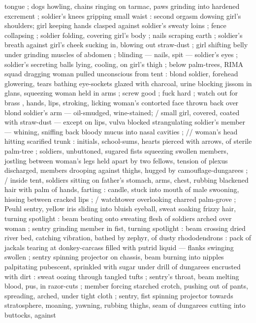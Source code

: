 \documentclass[10pt,twoside]{memoir}
\begin{document}
tongue ; dogs howling, chains ringing on tarmac, paws grinding into 
hardened excrement ; soldier's knees gripping small waist : second 
orgasm dowsing girl's shoulders; girl keeping hands clasped against 
soldier's sweaty loins ; fence collapsing ; soldier folding, covering 
girl's body ; nails scraping earth ; soldier's breath against girl's 
cheek sucking in, blowing out straw-dust ; girl shifting belly under 
grinding muscles of abdomen ; blinding --- nails, spit --- soldier's 
eyes ; soldier's secreting balls lying, cooling, on girl's thigh ; below 
palm-trees, RIMA squad dragging woman pulled unconscious from 
tent : blond soldier, forehead glowering, tears bathing eye-sockets 
glazed with charcoal, urine blocking jissom in glans, squeezing 
woman held in arms ; {\guillemotleft} screw good ; fuck hard ; watch out for brass
{\guillemotright}, hands, lips, stroking, licking woman's contorted face thrown back 
over blond soldier's arm --- oil-smudged, wine-stained; / small girl, 
covered, coated with straw-dust --- except on lips, vulva blocked 
strangulating soldier's member --- whining, sniffing back bloody 
mucus into nasal cavities ; // woman's head hitting scarified trunk : 
initials, school-sums, hearts pierced with arrows, of sterile palm-tree 
; soldiers, unbuttoned, sugared fists squeezing swollen members, 
jostling between woman's legs held apart by two fellows, tension of 
plexus discharged, members drooping against thighs, hugged by 
camouflage-dungarees ; / inside tent, soldiers sitting on father's 
stomach, arms, chest, rubbing blackened hair with palm of hands, 
farting : candle, stuck into mouth of male swooning, hissing between 
cracked lips ; / watchtower overlooking charred palm-grove ; Peuhl 
sentry, yellow iris sliding into bluish eyeball, sweat soaking frizzy 
hair, turning spotlight : beam beating onto sweating flesh of soldiers 
arched over woman ; sentry grinding member in fist, turning spotlight 
: beam crossing dried river bed, catching vibration, bathed by zephyr, 
of dusty rhododendrons : pack of jackals tearing at donkey-carcass 
filled with putrid liquid --- flanks swinging swollen ; sentry spinning 
projector on chassis, beam burning into nipples palpitating 
pubescent, sprinkled with sugar under drill of dungarees encrusted 
with dirt : sweat oozing through tangled tufts ; sentry's throat, beam 
melting blood, pus, in razor-cuts ; member forcing starched crotch, 
pushing out of pants, spreading, arched, under tight cloth ; sentry, 
fist spinning projector towards stratosphere, moaning, yawning, 
rubbing thighs, seam of dungarees cutting into buttocks, against 
\end{document}
